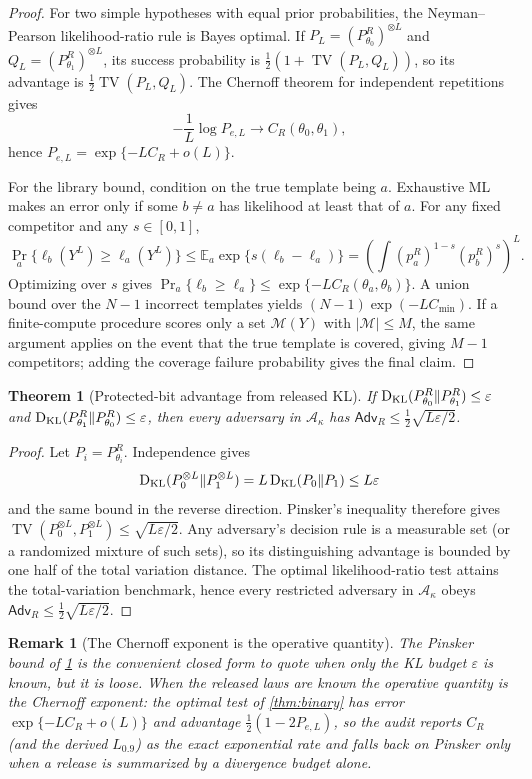 \documentclass[11pt]{article}
\newtheorem{theorem}{Theorem}
\newtheorem{remark}{Remark}
\DeclareMathOperator{\KL}{D_{\rm KL}}
\DeclareMathOperator{\TV}{TV}
\newcommand{\E}{\mathbb{E}}
\newcommand{\eps}{\varepsilon}
\newcommand{\calA}{\mathcal A}
\newcommand{\calM}{\mathcal M}
\newcommand{\Adv}{\mathsf{Adv}}
\begin{document}
\begin{proof}
For two simple hypotheses with equal prior probabilities, the Neyman--Pearson likelihood-ratio rule is Bayes optimal. If \(P_L=(P_{\theta_0}^R)^{\otimes L}\) and \(Q_L=(P_{\theta_1}^R)^{\otimes L}\), its success probability is \(\tfrac12(1+\TV(P_L,Q_L))\), so its advantage is \(\tfrac12\TV(P_L,Q_L)\). The Chernoff theorem for independent repetitions gives
\[
-\frac1L\log P_{e,L}\to C_R(\theta_0,\theta_1),
\]
hence \(P_{e,L}=\exp\{-LC_R+o(L)\}\).

For the library bound, condition on the true template being \(a\). Exhaustive ML makes an error only if some \(b\ne a\) has likelihood at least that of \(a\). For any fixed competitor and any \(s\in[0,1]\),
\[
\Pr_a\{\ell_b(Y^L)\ge\ell_a(Y^L)\}
\le
\E_a\exp\{s(\ell_b-\ell_a)\}
=
\left(\int (p_a^R)^{1-s}(p_b^R)^s\right)^L .
\]
Optimizing over \(s\) gives \(\Pr_a\{\ell_b\ge\ell_a\}\le \exp\{-LC_R(\theta_a,\theta_b)\}\). A union bound over the \(N-1\) incorrect templates yields \((N-1)\exp(-LC_{\min})\). If a finite-compute procedure scores only a set \(\calM(Y)\) with \(|\calM|\le M\), the same argument applies on the event that the true template is covered, giving \(M-1\) competitors; adding the coverage failure probability gives the final claim.
\end{proof}

\begin{theorem}[Protected-bit advantage from released KL]
\label{thm:protected-bit-adv}
If \(\KL(P_{\theta_0}^R\Vert P_{\theta_1}^R)\le\eps\) and \(\KL(P_{\theta_1}^R\Vert P_{\theta_0}^R)\le\eps\), then every adversary in \(\calA_\kappa\) has \(\Adv_R\le\tfrac12\sqrt{L\eps/2}\).
\end{theorem}

\begin{proof}
Let \(P_i=P_{\theta_i}^R\). Independence gives
\[
\KL(P_0^{\otimes L}\Vert P_1^{\otimes L})=L\KL(P_0\Vert P_1)\le L\eps
\]
and the same bound in the reverse direction. Pinsker's inequality therefore gives
\(\TV(P_0^{\otimes L},P_1^{\otimes L})\le\sqrt{L\eps/2}\). Any adversary's decision rule is a measurable set (or a randomized mixture of such sets), so its distinguishing advantage is bounded by one half of the total variation distance. The optimal likelihood-ratio test attains the total-variation benchmark, hence every restricted adversary in \(\calA_\kappa\) obeys \(\Adv_R\le\tfrac12\sqrt{L\eps/2}\).
\end{proof}

\begin{remark}[The Chernoff exponent is the operative quantity]
The Pinsker bound of \cref{thm:protected-bit-adv} is the convenient closed form to quote when only the KL budget \(\eps\) is known, but it is loose. When the released laws are known the operative quantity is the Chernoff exponent: the optimal test of \cref{thm:binary} has error \(\exp\{-LC_R+o(L)\}\) and advantage \(\tfrac12(1-2P_{e,L})\), so the audit reports \(C_R\) (and the derived \(L_{0.9}\)) as the exact exponential rate and falls back on Pinsker only when a release is summarized by a divergence budget alone.
\end{remark}
\end{document}
